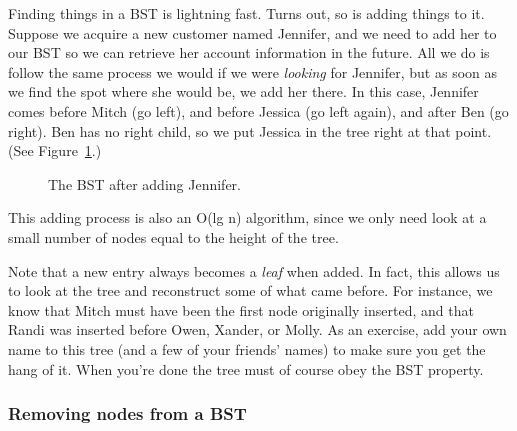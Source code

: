 Finding things in a BST is lightning fast. Turns out, so is adding things
to it. Suppose we acquire a new customer named Jennifer, and we need to add
her to our BST so we can retrieve her account information in the future.
All we do is follow the same process we would if we were \textit{looking}
for Jennifer, but as soon as we find the spot where she would be, we add
her there. In this case, Jennifer comes before Mitch (go left), and before
Jessica (go left again), and after Ben (go right). Ben has no right child,
so we put Jessica in the tree right at that point. (See
Figure~\ref{bstadd1}.)

\begin{figure}[ht]
\centering
\begin{custommargins}{-2.1cm}{-3cm}
\caption{The BST after adding Jennifer.}
\label{bstadd1}
\end{custommargins}
\end{figure}

This adding process is also an O(lg n) algorithm, since we only need look
at a small number of nodes equal to the height of the tree.

Note that a new entry always becomes a \textit{leaf} when added. In fact,
this allows us to look at the tree and reconstruct some of what came
before. For instance, we know that Mitch must have been the first node
originally inserted, and that Randi was inserted before Owen, Xander, or
Molly. As an exercise, add your own name to this tree (and a few of your
friends' names) to make sure you get the hang of it. When you're done the
tree must of course obey the BST property.

\subsubsection{Removing nodes from a BST}

